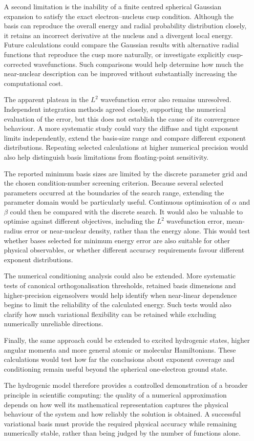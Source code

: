 A second limitation is the inability of a finite centred spherical Gaussian expansion to satisfy the exact electron--nucleus cusp condition. Although the basis can reproduce the overall energy and radial probability distribution closely, it retains an incorrect derivative at the nucleus and a divergent local energy. Future calculations could compare the Gaussian results with alternative radial functions that reproduce the cusp more naturally, or investigate explicitly cusp-corrected wavefunctions. Such comparisons would help determine how much the near-nuclear description can be improved without substantially increasing the computational cost.

The apparent plateau in the $L^2$ wavefunction error also remains unresolved. Independent integration methods agreed closely, supporting the numerical evaluation of the error, but this does not establish the cause of its convergence behaviour. A more systematic study could vary the diffuse and tight exponent limits independently, extend the basis-size range and compare different exponent distributions. Repeating selected calculations at higher numerical precision would also help distinguish basis limitations from floating-point sensitivity.

The reported minimum basis sizes are limited by the discrete parameter grid and the chosen condition-number screening criterion. Because several selected parameters occurred at the boundaries of the search range, extending the parameter domain would be particularly useful. Continuous optimisation of $\alpha$ and $\beta$ could then be compared with the discrete search. It would also be valuable to optimise against different objectives, including the $L^2$ wavefunction error, mean-radius error or near-nuclear density, rather than the energy alone. This would test whether bases selected for minimum energy error are also suitable for other physical observables, or whether different accuracy requirements favour different exponent distributions.

The numerical conditioning analysis could also be extended. More systematic tests of canonical orthogonalisation thresholds, retained basis dimensions and higher-precision eigensolvers would help identify when near-linear dependence begins to limit the reliability of the calculated energy. Such tests would also clarify how much variational flexibility can be retained while excluding numerically unreliable directions.

Finally, the same approach could be extended to excited hydrogenic states, higher angular momenta and more general atomic or molecular Hamiltonians. These calculations would test how far the conclusions about exponent coverage and conditioning remain useful beyond the spherical one-electron ground state.

The hydrogenic model therefore provides a controlled demonstration of a broader principle in scientific computing: the quality of a numerical approximation depends on how well its mathematical representation captures the physical behaviour of the system and how reliably the solution is obtained. A successful variational basis must provide the required physical accuracy while remaining numerically stable, rather than being judged by the number of functions alone.
